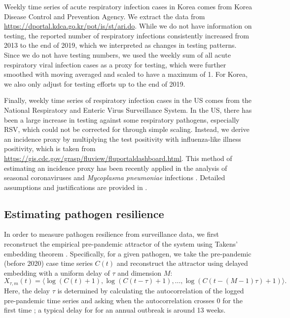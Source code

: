 \documentclass[12pt]{article}
\begin{document}
Weekly time series of acute respiratory infection cases in Korea comes from Korea Disease Control and Prevention Agency.
We extract the data from \url{https://dportal.kdca.go.kr/pot/is/st/ari.do}.
While we do not have information on testing, the reported number of respiratory infections consistently increased from 2013 to the end of 2019, which we interpreted as changes in testing patterns.
Since we do not have testing numbers, we used the weekly sum of all acute respiratory viral infection cases as a proxy for testing, which were further smoothed with moving averaged and scaled to have a maximum of 1.
For Korea, we also only adjust for testing efforts up to the end of 2019.

Finally, weekly time series of respiratory infection cases in the US comes from the National Respiratory and Enteric Virus Surveillance System.
In the US, there has been a large increase in testing against some respiratory pathogens, especially RSV, which could not be corrected for through simple scaling.
Instead, we derive an incidence proxy by multiplying the test positivity with influenza-like illness positivity, which is taken from \url{https://gis.cdc.gov/grasp/fluview/fluportaldashboard.html}.
This method of estimating an incidence proxy has been recently applied in the analysis of seasonal coronaviruses \citep{kissler2020projecting} and \textit{Mycoplasma pneumoniae} infections \citep{park2024predicting}.
Detailed assumptions and justifications are provided in \citep{goldstein2011predicting}.

\subsection*{Estimating pathogen resilience}

In order to measure pathogen resilience from surveillance data, we first reconstruct the empirical pre-pandemic attractor of the system using Takens' embedding theorem \citep{takens2006detecting}.
Specifically, for a given pathogen, we take the pre-pandemic (before 2020) case time series $C(t)$ and reconstruct the attractor using delayed embedding with a uniform delay of $\tau$ and dimension $M$:
\begin{equation}
X_{\tau,m}(t) = \langle\log(C(t)+1), \log(C(t-\tau)+1), \dots, \log(C(t-(M-1)\tau)+1)\rangle.
\end{equation}
Here, the delay $\tau$ is determined by calculating the autocorrelation of the logged pre-pandemic time series and asking when the autocorrelation crosses 0 for the first time \citep{tan2023selecting};
a typical delay for for an annual outbreak is around 13 weeks.
\end{document}
